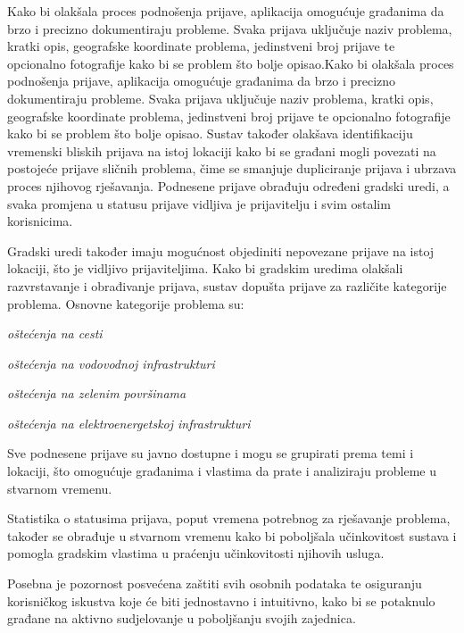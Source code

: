 \noindent Kako bi olakšala proces podnošenja prijave, aplikacija omogućuje građanima da brzo i precizno dokumentiraju probleme. Svaka prijava uključuje naziv problema, kratki opis, geografske koordinate problema, jedinstveni broj prijave te opcionalno fotografije kako bi se problem što bolje opisao.Kako bi olakšala proces podnošenja prijave, aplikacija omogućuje građanima da brzo i precizno dokumentiraju probleme. Svaka prijava uključuje naziv problema, kratki opis, geografske koordinate problema, jedinstveni broj prijave te opcionalno fotografije kako bi se problem što bolje opisao.
\noindent Sustav također olakšava identifikaciju vremenski bliskih prijava na istoj lokaciji kako bi se građani mogli povezati na postojeće prijave sličnih problema, čime se smanjuje dupliciranje prijava i ubrzava proces njihovog rješavanja.
\noindent Podnesene prijave obrađuju određeni gradski uredi, a svaka promjena u statusu prijave vidljiva je prijavitelju i svim ostalim korisnicima.

\noindent Gradski uredi također imaju mogućnost objediniti nepovezane prijave na istoj lokaciji, što je vidljivo prijaviteljima.
\noindent Kako bi gradskim uredima olakšali razvrstavanje i obrađivanje prijava, sustav dopušta prijave za različite kategorije problema. Osnovne kategorije problema su:

\begin{packed_item}
	\item \textit{oštećenja na cesti}
	\item \textit{oštećenja na vodovodnoj infrastrukturi}
	\item \textit{oštećenja na zelenim površinama}
	\item \textit{oštećenja na elektroenergetskoj infrastrukturi}
\end{packed_item}

\noindent Sve podnesene prijave su javno dostupne i mogu se grupirati prema temi i lokaciji, što omogućuje građanima i vlastima da prate i analiziraju probleme u stvarnom vremenu.

\noindent Statistika o statusima prijava, poput vremena potrebnog za rješavanje problema, također se obrađuje u stvarnom vremenu kako bi poboljšala učinkovitost sustava i pomogla gradskim vlastima u praćenju učinkovitosti njihovih usluga.

\noindent Posebna je pozornost posvećena zaštiti svih osobnih podataka te osiguranju korisničkog iskustva koje će biti jednostavno i intuitivno, kako bi se potaknulo građane na aktivno sudjelovanje u poboljšanju svojih zajednica.

